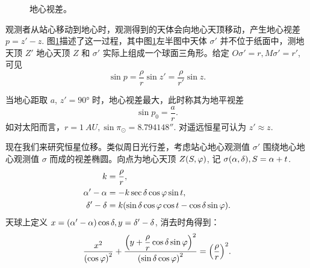 \documentclass[UTF8, 12pt, a4paper, oneside, onecolumn, fontset=none]{ctexart}
\begin{document}
\begin{figure}[!htbp]
\begin{minipage}[t]{0.45\textwidth}
\end{minipage}
\begin{minipage}[t]{0.45\textwidth}
\end{minipage}
\captionsetup{justification=raggedright, singlelinecheck=false}
\caption{地心视差。}
\label{地心视差。}
\end{figure}

观测者从站心移动到地心时，观测得到的天体会向地心天顶移动，产生地心视差 $p=z'-z$. 图\ref{地心视差。}描述了这一过程，其中图\ref{地心视差。}左半图中天体 $\sigma'$ 并不位于纸面中，测地天顶 $Z'$ 地心天顶 $Z$ 和 $\sigma'$ 实际上组成一个球面三角形。给定 $O\sigma'=r, M\sigma'=r'$, 可见
\begin{equation}
\sin{p}=\frac{\rho}{r}\sin{z'}=\frac{\rho}{r'}\sin{z}.
\end{equation}

当地心距取 $a$, $z'=\ang{90;;}$ 时，地心视差最大，此时称其为地平视差
\begin{equation}
\sin{p_{0}}=\frac{a}{r}.
\end{equation}
如对太阳而言，$r=\qty{1}{AU},\sin{\pi_{\odot}}=\ang{;; 8.794148}$. 对遥远恒星可认为 $z'\approx z$.

现在我们来研究恒星位移。类似周日光行差，考虑站心地心观测值 $\sigma'$ 围绕地心地心观测值 $\sigma$ 而成的视差椭圆。向点为地心天顶 $Z\mleft(S,\varphi\mright)$, 记 $\sigma\mleft(\alpha,\delta\mright), S=\alpha+t$.
\begin{align}
k&=\frac{\rho}{r},\\
\alpha'-\alpha&=-k\sec{\delta}\cos{\varphi}\sin{t},\\
\delta'-\delta&=k\mleft(\sin{\delta}\cos{\varphi}\cos{t}-\cos{\delta}\sin{\varphi}\mright).
\end{align}
天球上定义 $x=\mleft(\alpha'-\alpha\mright)\cos{\delta}, y=\delta'-\delta$, 消去时角得到：
\begin{equation}
\frac{x^{2}}{\mleft(\cos{\varphi}\mright)^{2}}+\frac{\mleft(y+\dfrac{\rho}{r}\cos{\delta}\sin{\varphi}\mright)^{2}}{\mleft(\sin{\delta}\cos{\varphi}\mright)^{2}}=\mleft(\frac{\rho}{r}\mright)^{2}.
\end{equation}
\end{document}
